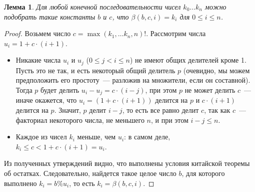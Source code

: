 \documentclass[a4paper,11pt]{article}
\newtheorem{lmm}[thm]{Лемма}
\theoremstyle{definition}
\begin{document}
\begin{lmm}
Для любой конечной последовательности чисел $k_0 \dots k_n$ можно подобрать
такие константы $b$ и $c$, что $\beta(b, c, i) = k_i$ для $0 \le i \le n$.
\end{lmm}
\begin{proof}
Возьмем число $c = \max(k_1, \dots k_n, n)!$. Рассмотрим числа $u_i = 1 + c
\cdot (i + 1)$.
\begin{itemize}
\item Никакие числа $u_i$ и $u_j$ ($0 \le j < i \le n$) не имеют общих делителей
  кроме 1. Пусть это не так, и есть некоторый общий делитель $p$ (очевидно, мы
  можем предположить его простоту~--- разложив на множители, если он составной).
  Тогда $p$ будет делить $u_i - u_j = c \cdot (i - j)$, при этом $p$ не может
  делить $c$~--- иначе окажется, что $u_i = (1 + c \cdot (i + 1))$ делится на
  $p$ и $c \cdot (i + 1)$ делится на $p$. Значит, $p$ делит $i - j$, то есть все
  равно делит $c$, так как $c$~--- факториал некоторого числа, не меньшего $n$,
  и при этом $i - j \le n$.
\item Каждое из чисел $k_i$ меньше, чем $u_i$: в самом деле, $k_i \le c < 1 + c
  \cdot (i + 1) = u_i$.
\end{itemize}
Из полученных утверждений видно, что выполнены условия китайской теоремы об
остатках. Следовательно, найдется такое целое число $b$, для которого выполнено
$k_i = b \% u_i$, то есть $k_i = \beta(b, c, i)$.
\end{proof}
\end{document}
